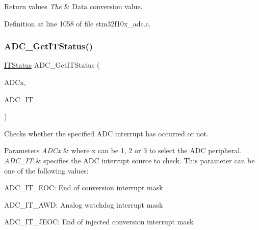 \begin{DoxyRetVals}{Return values}
{\em The} & Data conversion value. \\
\hline
\end{DoxyRetVals}


Definition at line 1058 of file stm32f10x\+\_\+adc.\+c.

\mbox{\label{group___a_d_c___private___functions_gaa1d3b910a83dbf14d4f68c8eef058612}} 
\subsubsection{\texorpdfstring{A\+D\+C\+\_\+\+Get\+I\+T\+Status()}{ADC\_GetITStatus()}}
{\footnotesize\ttfamily \hyperlink{group___exported__types_gaacbd7ed539db0aacd973a0f6eca34074}{I\+T\+Status} A\+D\+C\+\_\+\+Get\+I\+T\+Status (\begin{DoxyParamCaption}\item[{\hyperlink{struct_a_d_c___type_def}{A\+D\+C\+\_\+\+Type\+Def} $\ast$}]{A\+D\+Cx,  }\item[{uint16\+\_\+t}]{A\+D\+C\+\_\+\+IT }\end{DoxyParamCaption})}



Checks whether the specified A\+DC interrupt has occurred or not. 


\begin{DoxyParams}{Parameters}
{\em A\+D\+Cx} & where x can be 1, 2 or 3 to select the A\+DC peripheral. \\
\hline
{\em A\+D\+C\+\_\+\+IT} & specifies the A\+DC interrupt source to check. This parameter can be one of the following values\+: \begin{DoxyItemize}
\item A\+D\+C\+\_\+\+I\+T\+\_\+\+E\+OC\+: End of conversion interrupt mask \item A\+D\+C\+\_\+\+I\+T\+\_\+\+A\+WD\+: Analog watchdog interrupt mask \item A\+D\+C\+\_\+\+I\+T\+\_\+\+J\+E\+OC\+: End of injected conversion interrupt mask \end{DoxyItemize}
\\
\hline
\end{DoxyParams}

